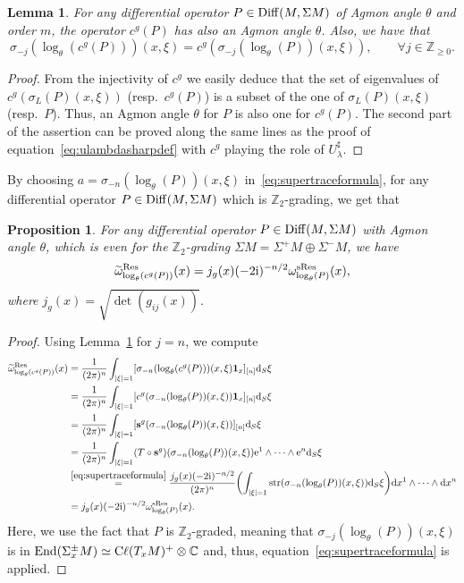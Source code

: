\documentclass[pdftex]{sigma}
\numberwithin{equation}{section}
\newtheorem{lem}[thm]{Lemma}
\newtheorem{prop}[thm]{Proposition}
\theoremstyle{definition}
\newcommand{\C}{\mathbb C}
\newcommand{\Z}{\mathbb Z}
\newcommand{\Cl}{{\rm C}\ell}
\def \bui#1#2{\mathrel{\mathop{\kern 0pt#1}\limits^{#2}}}
\begin{document}
\begin{lem} \label{lem:sigmalo} For any differential operator $P\in {\rm Diff}(M,\Sigma M)$ of Agmon angle $\theta$ and order $m$, the operator $c^g(P)$ has also an Agmon angle $\theta$. Also, we have that
\[\sigma_{-j}(\log _\theta (c^g(P)))(x,\xi)=c^g(\sigma_{-j}(\log _\theta(P))(x,\xi)),\qquad \forall j\in \Z_{\geq 0}. \]
\end{lem}

\begin{proof} From the injectivity of $c^g$ we easily deduce that the set of eigenvalues of $c^g(\sigma_L(P)(x,\xi))$ (resp.\ $c^g(P)$) is a subset of the one of $\sigma_L(P)(x,\xi)$ (resp.\ $P$). Thus, an Agmon angle $\theta$ for $P$ is also one for $c^g(P)$.
The second part of the assertion can be proved along the same lines as the proof of equation~\eqref{eq:ulambdasharpdef} with $c^g$ playing the role of $U_\lambda^\sharp$.
\end{proof}

By choosing $a=\sigma_{-n} (\log_\theta (P)) (x, \xi)$ in~\eqref{eq:supertraceformula}, for any differential operator $P\in {\rm Diff}(M,\Sigma M)$ which is $\Z_2$-grading, we get that

\begin{prop}\label{prop:tildeomegavsomega}
For any differential operator $P\in {\rm Diff}(M,\Sigma M)$ with Agmon angle $\theta$, which is even for the $\Z_2$-grading $\Sigma M=\Sigma^+ M\oplus \Sigma^- M$, we have
\[\widetilde \omega^{\rm Res}_{\log_\theta (c^g(P))}(x)=j_g(x)(-2{\rm i})^{-n/2}\omega^{\rm sRes}_{\log_\theta (P)}(x),\]
where $j_g(x)=\sqrt{\det  (g_{ij}(x))}$.
\end{prop}
\begin{proof} Using Lemma~\ref{lem:sigmalo} for $j=n$, we compute
\begin{align*}
\widetilde \omega^{\rm Res}_{\log_\theta (c^g(P))}(x)&{}=\frac{1}{(2\pi)^n}\int_{|\xi|=1} [ \sigma_{-n} (\log_\theta (c^g(P))) (x, \xi) {\bf 1}_x ]_{[n]} {\rm d}_S\xi\\
&{}=\frac{1}{(2\pi)^n}\int_{|\xi|=1} [ c^g(\sigma_{-n} (\log_\theta (P)) (x, \xi)) {\bf 1}_x ]_{[n]} {\rm d}_S\xi\\
&{}=\frac{1}{(2\pi)^n}\int_{|\xi|=1} [ {\bf s}^g(\sigma_{-n} (\log_\theta (P)) (x, \xi)) ]_{[n]} {\rm d}_S\xi\\
&{}=\frac{1}{(2\pi)^n}\int_{|\xi|=1} (T\circ {\bf s}^g)(\sigma_{-n} (\log_\theta (P)) (x, \xi) ){\rm e}^1\wedge\dots \wedge {\rm e}^n {\rm d}_S\xi\\
&{}\bui{=}{\eqref{eq:supertraceformula}}\frac{j_g(x)(-2{\rm i})^{-n/2}}{(2\pi)^n}\biggl(\int_{|\xi|=1}{\rm str} (\sigma_{-n}(\log_\theta (P)) (x, \xi) ) {\rm d}_S\xi \biggr) {\rm d}x^1\wedge\dots\wedge {\rm d}x^n\\
&{}=j_g(x)(-2{\rm i})^{-n/2} \omega^{\rm sRes}_{\log_\theta (P)}(x).
\end{align*}
Here, we use the fact that $P$ is $\Z_2$-graded, meaning that $\sigma_{-j}(\log _\theta (P))(x,\xi)$ is in $\operatorname{End}(\Sigma_x^{\pm} M)\simeq \Cl(T_xM)^+\otimes \C$ and, thus, equation~\eqref{eq:supertraceformula} is applied.
\end{proof}
\end{document}
